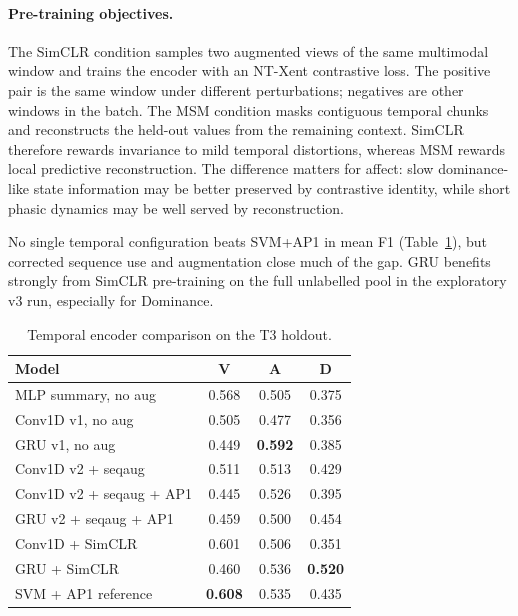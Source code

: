 \documentclass[sigconf,review,anonymous]{acmart}
\newcommand{\best}[1]{\textbf{\textcolor{bestcol}{#1}}}
\begin{document}
\paragraph{Pre-training objectives.}
The SimCLR condition samples two augmented views of the same multimodal window
and trains the encoder with an NT-Xent contrastive loss.
The positive pair is the same window under different perturbations; negatives
are other windows in the batch.
The MSM condition masks contiguous temporal chunks and reconstructs the held-out
values from the remaining context.
SimCLR therefore rewards invariance to mild temporal distortions, whereas MSM
rewards local predictive reconstruction.
The difference matters for affect: slow dominance-like state information may be
better preserved by contrastive identity, while short phasic dynamics may be
well served by reconstruction.

No single temporal configuration beats SVM+AP1 in mean F1
(Table~\ref{tab:temporal}), but corrected sequence use and augmentation close
much of the gap.
GRU benefits strongly from SimCLR pre-training on the full unlabelled pool in
the exploratory v3 run, especially for Dominance.

\begin{table}[t]
\caption{Temporal encoder comparison on the T3 holdout.}
\label{tab:temporal}
\centering
\setlength{\tabcolsep}{4pt}
\small
\begin{tabular}{lccc}
\toprule
\textbf{Model} & \textbf{V} & \textbf{A} & \textbf{D} \\
\midrule
MLP summary, no aug       & 0.568 & 0.505 & 0.375 \\
Conv1D v1, no aug         & 0.505 & 0.477 & 0.356 \\
GRU v1, no aug            & 0.449 & \best{0.592} & 0.385 \\
\midrule
Conv1D v2 + seqaug        & 0.511 & 0.513 & 0.429 \\
Conv1D v2 + seqaug + AP1  & 0.445 & 0.526 & 0.395 \\
GRU v2 + seqaug + AP1     & 0.459 & 0.500 & 0.454 \\
\midrule
Conv1D + SimCLR           & 0.601 & 0.506 & 0.351 \\
GRU + SimCLR              & 0.460 & 0.536 & \best{0.520} \\
\midrule
SVM + AP1 reference       & \best{0.608} & 0.535 & 0.435 \\
\bottomrule
\end{tabular}
\end{table}
\end{document}
